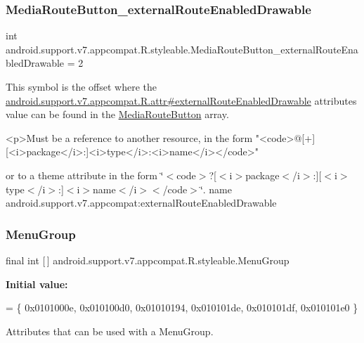 \subsubsection{\texorpdfstring{Media\+Route\+Button\+\_\+external\+Route\+Enabled\+Drawable}{MediaRouteButton\_externalRouteEnabledDrawable}}
{\footnotesize\ttfamily int android.\+support.\+v7.\+appcompat.\+R.\+styleable.\+Media\+Route\+Button\+\_\+external\+Route\+Enabled\+Drawable = 2\hspace{0.3cm}{\ttfamily [static]}}

This symbol is the offset where the \hyperlink{classandroid_1_1support_1_1v7_1_1appcompat_1_1R_1_1attr_a413c20085b4ef8fcd95a38eb99a4f30d}{android.\+support.\+v7.\+appcompat.\+R.\+attr\#external\+Route\+Enabled\+Drawable} attribute\textquotesingle{}s value can be found in the \hyperlink{classandroid_1_1support_1_1v7_1_1appcompat_1_1R_1_1styleable_a72a73867c6dd3b8e7dcaca5a3ce1e2d6}{Media\+Route\+Button} array.

\begin{DoxyVerb}      <p>Must be a reference to another resource, in the form "<code>@[+][<i>package</i>:]<i>type</i>:<i>name</i></code>"
\end{DoxyVerb}
 or to a theme attribute in the form \char`\"{}$<$code$>$?\mbox{[}$<$i$>$package$<$/i$>$\+:\mbox{]}\mbox{[}$<$i$>$type$<$/i$>$\+:\mbox{]}$<$i$>$name$<$/i$>$$<$/code$>$\char`\"{}.  name android.\+support.\+v7.\+appcompat\+:external\+Route\+Enabled\+Drawable \mbox{\label{classandroid_1_1support_1_1v7_1_1appcompat_1_1R_1_1styleable_aef793c0a19e198b57791fed45ec2804e}} 
\subsubsection{\texorpdfstring{Menu\+Group}{MenuGroup}}
{\footnotesize\ttfamily final int \mbox{[}$\,$\mbox{]} android.\+support.\+v7.\+appcompat.\+R.\+styleable.\+Menu\+Group\hspace{0.3cm}{\ttfamily [static]}}

{\bfseries Initial value\+:}
\begin{DoxyCode}
= \{
            0x0101000e, 0x010100d0, 0x01010194, 0x010101de,
            0x010101df, 0x010101e0
        \}
\end{DoxyCode}
Attributes that can be used with a Menu\+Group. 


